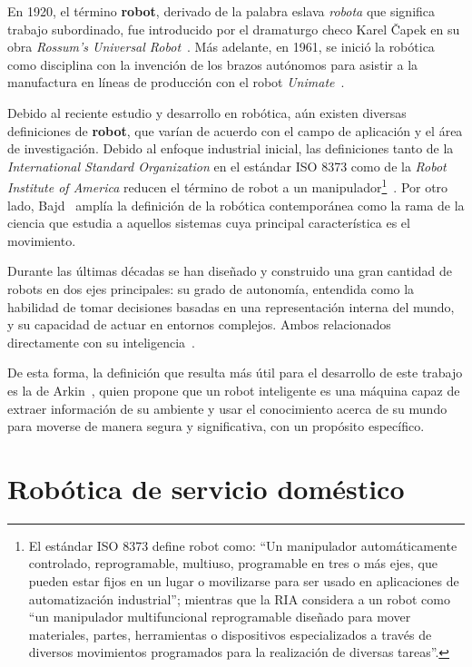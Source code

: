 En 1920, el término \textbf{robot}, derivado de la palabra eslava \emph{robota} que significa trabajo subordinado, fue introducido por el dramaturgo checo Karel Čapek en su obra \emph{Rossum's Universal Robot}~\cite{robotics_handbook}. Más adelante, en 1961, se inició la robótica como disciplina con la invención de los brazos autónomos para asistir a la manufactura en líneas de producción con el robot \emph{Unimate}~\cite{yazmin_intro}.

Debido al reciente estudio y desarrollo en robótica, aún existen diversas definiciones de \textbf{robot}, que varían de acuerdo con el campo de aplicación y el área de investigación. Debido al enfoque industrial inicial, las definiciones tanto de la \emph{International Standard Organization} en el estándar ISO 8373 como de la \emph{Robot Institute of America} reducen el término de robot a un manipulador\footnote{El estándar ISO 8373 define robot como: ``Un manipulador automáticamente controlado, reprogramable, multiuso, programable en tres o más ejes, que pueden estar fijos en un lugar o movilizarse para ser usado en aplicaciones de automatización industrial''; mientras que la  RIA considera a un robot como ``un manipulador multifuncional reprogramable diseñado para mover materiales, partes, herramientas o dispositivos especializados a través de diversos movimientos programados para la realización de diversas tareas''.}~\cite{yazmin_robotsServicio}. Por otro lado, Bajd~\cite{bajd_introRobotics} amplía la definición de la robótica contemporánea como la rama de la ciencia que estudia a aquellos sistemas cuya principal característica es el movimiento.

Durante las últimas décadas se han diseñado y construido una gran cantidad de robots en dos ejes principales: su grado de autonomía, entendida como la habilidad de tomar decisiones basadas en una representación interna del mundo, y su capacidad de actuar en entornos complejos. Ambos relacionados directamente con su inteligencia~\cite{yazmin_intro}.

\hypertarget{arkin}{De esta forma, la definición que resulta más útil para el desarrollo de este trabajo es la de Arkin~\cite{arkin}, quien propone que un robot inteligente es una máquina capaz de extraer información de su ambiente y usar el conocimiento acerca de su mundo para moverse de manera segura y significativa, con un propósito específico.}

\section{Robótica de servicio doméstico}

